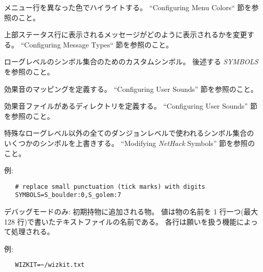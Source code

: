 \item[\bb{MENUCOLOR}]
メニュー行を異なった色でハイライトする。
``Configuring Menu Colors`` 節を参照のこと。
\item[\bb{MSGTYPE}]
上部ステータス行に表示されるメッセージがどのように表示されるかを変更する。
``Configuring Message Types`` 節を参照のこと。
\item[\bb{ROGUESYMBOLS}]
ローグレベルのシンボル集合のためのカスタムシンボル。
後述する {\it SYMBOLS} を参照のこと。
\item[\bb{SOUND}]
効果音のマッピングを定義する。
``Configuring User Sounds'' 節を参照のこと。
\item[\bb{SOUNDDIR}]
効果音ファイルがあるディレクトリを定義する。
``Configuring User Sounds'' 節を参照のこと。
\item[\bb{SYMBOLS}]
特殊なローグレベル以外の全てのダンジョンレベルで使われるシンボル集合の
いくつかのシンボルを上書きする。
``Modifying {\it NetHack\/} Symbols'' 節を参照のこと。

例:
\begin{verbatim}
   # replace small punctuation (tick marks) with digits
   SYMBOLS=S_boulder:0,S_golem:7
\end{verbatim}

\item[\bb{WIZKIT}]
デバッグモードのみ: 初期持物に追加される物。
値は物の名前を 1 行一つ(最大 128 行)で書いたテキストファイルの名前である。
各行は願いを扱う機能によって処理される。

例:
\begin{verbatim}
   WIZKIT=~/wizkit.txt
\end{verbatim}
\elist

